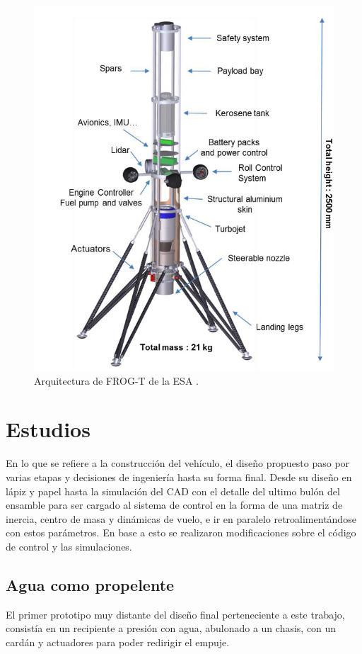 \begin{figure}[htb]
    \centering
    \includegraphics[width=0.8\linewidth]{fig/frogTArch.png}
    \caption{Arquitectura de FROG-T de la ESA \cite{rmili2019frog}.}
    \label{fig:frogtarch}
\end{figure}

\null\newpage
\clearpage

\section{Estudios}
En lo que se refiere a la construcción del vehículo, el diseño propuesto paso por varias etapas y
decisiones de ingeniería hasta su forma final. Desde su diseño en lápiz y papel hasta la
simulación del CAD con el detalle del ultimo bulón del ensamble para ser cargado al sistema de control en la forma de una matriz de inercia, centro de masa y dinámicas de vuelo, e ir en paralelo retroalimentándose con estos parámetros. En base a esto se realizaron modificaciones sobre el código de control y las simulaciones.


\subsection{Agua como propelente}\label{ssec:propAgua}
El primer prototipo muy distante del diseño final perteneciente a este trabajo, consistía en un
recipiente a presión con agua, abulonado a un chasis, con un cardán y actuadores para poder redirigir el
empuje. 

